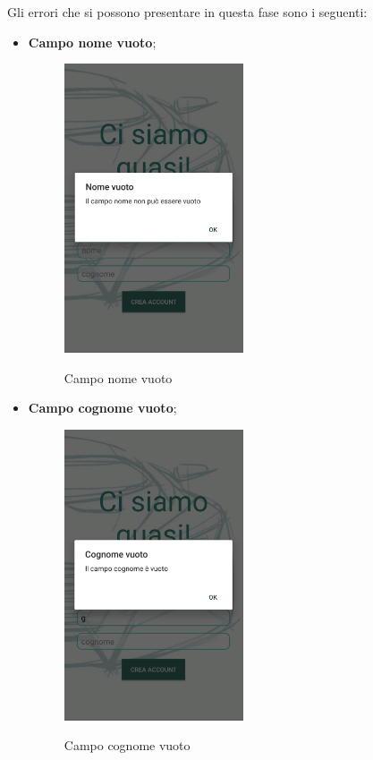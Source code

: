 \pagebreak
Gli errori che si possono presentare in questa fase sono i seguenti:
\begin{itemize}
	\item \textbf{Campo nome vuoto};
	\begin{figure}[H] 
		\centering 
		\includegraphics[width=0.5\textwidth]{res/images/errore_nome.png}\\
		\caption{Campo nome vuoto}
		\label{error_name}
	\end{figure}
	\pagebreak
	\item \textbf{Campo cognome vuoto};
	\begin{figure}[H] 
		\centering 
		\includegraphics[width=0.5\textwidth]{res/images/errore_cognome.png}\\
		\caption{Campo cognome vuoto}
		\label{error_surname}
	\end{figure}
\end{itemize}

